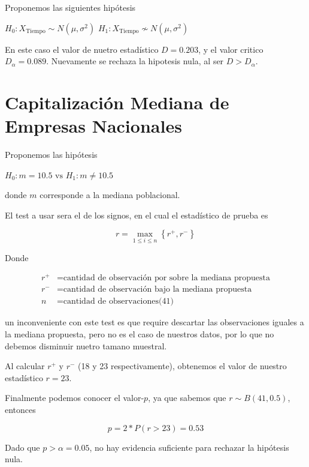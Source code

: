 \documentclass{article}
\begin{document}
    Proponemos las siguientes hip\'otesis
    \begin{center}
        $H_0: X_{\text{Tiempo}} \sim N(\mu, \sigma^2)$  $H_1: X_{\text{Tiempo}} \not\sim N(\mu, \sigma^2)$
    \end{center}

    En este caso el valor de nuetro estad\'istico $D = 0.203$, y el valor critico $D_\alpha = 0.089$. Nuevamente se rechaza la hipotesis nula, al ser $D > D_\alpha$.
    
    \section{Capitalizaci\'on Mediana de Empresas Nacionales}

    Proponemos las hip\'otesis
    \begin{center}
        $H_0: m = 10.5 \text{ vs } H_1: m \neq 10.5$
    \end{center}
    donde $m$ corresponde a la mediana poblacional.

    El test a usar sera el de los signos, en el cual el estad\'istico de prueba es

    \begin{equation}
        r = \max\limits_{1\leq i\leq n} \left\{ r^{+}, r^{-}\right\}
    \end{equation}

    Donde

    \begin{align}
        r^{+} &= \text{cantidad de observaci\'on por sobre la mediana propuesta} \\
        r^{-} &= \text{cantidad de observaci\'on bajo la mediana propuesta} \\
            n &= \text{cantidad de observaciones(41)}
    \end{align}
    
    un inconveniente con este test es que require descartar las observaciones iguales a la mediana propuesta, pero no es el caso de nuestros datos, por lo que no debemos disminuir nuetro tamano muestral.

    Al calcular $r^{+}$ y $r^{-}$ (18 y 23 respectivamente), obtenemos el valor de nuestro estad\'istico $r = 23$.

    Finalmente podemos conocer el valor-$p$, ya que sabemos que $r \sim B(41, 0.5)$, entonces

    \begin{equation}
        p = 2 * P(r > 23 ) = 0.53
    \end{equation}

    Dado que $p > \alpha = 0.05$, no hay evidencia suficiente para rechazar la hip\'otesis nula.
\end{document}
